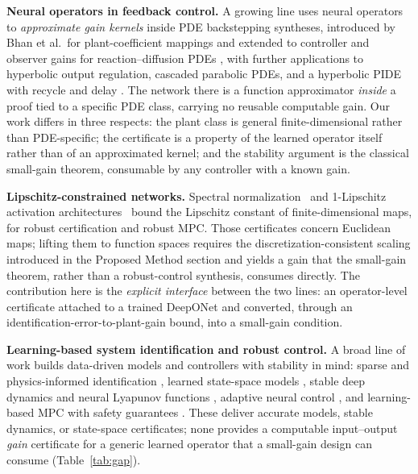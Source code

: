 \documentclass[11pt,sagev,times]{sagej}
\begin{document}
\textbf{Neural operators in feedback control.} A growing line uses neural
operators to \emph{approximate gain kernels} inside PDE backstepping
syntheses, introduced by Bhan et al.\ for plant-coefficient mappings and
extended to controller and observer gains for reaction--diffusion PDEs
\citep{bhan2024bypassing,krstic2024observer}, with further applications to hyperbolic
output regulation, cascaded parabolic PDEs, and a hyperbolic PIDE with recycle
and delay \citep{xiao2024output,lv2025cascaded,qi2024pide}.
The network there is a function approximator \emph{inside} a proof tied to a
specific PDE class, carrying no reusable computable gain. Our work differs in
three respects: the plant class is general finite-dimensional rather than
PDE-specific; the certificate is a property of the learned operator itself
rather than of an approximated kernel; and the stability argument is the
classical small-gain theorem, consumable by any controller with a known gain.

\textbf{Lipschitz-constrained networks.} Spectral
normalization~\citep{miyato2018spectral} and 1-Lipschitz activation
architectures~\citep{pauli2021lipschitz} bound the Lipschitz constant of
finite-dimensional maps, for robust certification and robust MPC. Those
certificates concern Euclidean maps; lifting them to function spaces requires
the discretization-consistent scaling introduced in the Proposed Method section and yields a
gain that the small-gain theorem, rather than a robust-control synthesis,
consumes directly. The contribution here is the \emph{explicit interface} between the two lines:
an operator-level certificate attached to a trained DeepONet and converted,
through an identification-error-to-plant-gain bound, into a small-gain
condition.

\textbf{Learning-based system identification and robust control.} A broad
line of work builds data-driven models and controllers with stability in
mind: sparse and physics-informed identification
\citep{brunton2016sindy,raissi2019pinn}, learned state-space models
\citep{lusch2018deep,masti2021learning}, stable deep dynamics and neural
Lyapunov functions \citep{kolter2019learning,chang2019neural}, adaptive
neural control \citep{liang2024learning,zheng2024adaptive}, and
learning-based MPC with safety guarantees \citep{hewing2020learning}. These
deliver accurate models, stable dynamics, or state-space certificates; none
provides a computable input--output \emph{gain} certificate for a
generic learned operator that a small-gain design can consume
(Table~\ref{tab:gap}).
\end{document}
